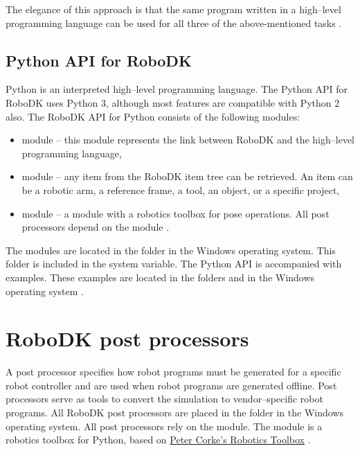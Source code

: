 The elegance of this approach is that the same program written in a high--level programming language can be used for all three of the above-mentioned tasks \cite{robodkapi}. 

\subsection{Python API for RoboDK}

Python is an interpreted high--level programming language. The Python API for RoboDK uses Python 3, although most features are compatible with Python 2 also. The RoboDK API for Python consists of the following modules:

\begin{itemize}
    \item {} module -- this module represents the link between RoboDK and the high--level programming language,
    \item {} module -- any item from the RoboDK item tree can be retrieved.  An item can be a robotic arm, a reference frame, a tool, an object, or a specific project,
    \item {} module -- a module with a robotics toolbox for pose operations. All post processors depend on the  module .
\end{itemize}

The modules are located in the folder   in the Windows operating system. This folder is included in the  system variable. The Python API is accompanied with examples. These examples are located in the folders \newline {} and    in the Windows operating system \cite{robodkapipython}.

\section{RoboDK post processors}

A post processor specifies how robot programs must be generated for a specific robot controller and are used when robot programs are generated offline. Post processors serve as tools to convert the simulation to vendor--specific robot programs. All RoboDK post processors are placed in the  folder in the Windows operating system. All post processors rely on the  module. The  module is a robotics toolbox for Python, based on \href{http://petercorke.com/Robotics_Toolbox.html}{Peter Corke’s Robotics Toolbox} \cite{robodkapipython}. 

